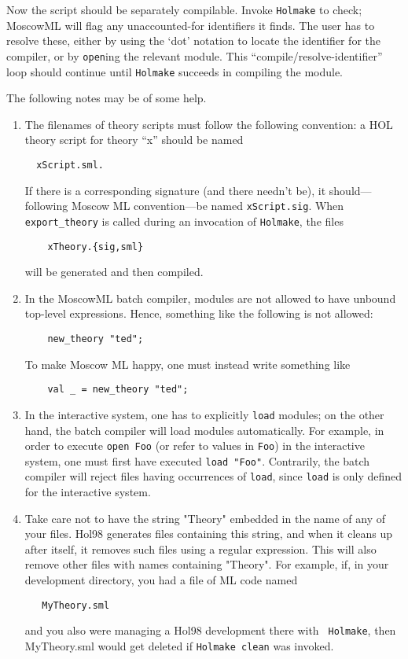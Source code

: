 \documentclass[12pt,fleqn,a4paper]{report}
\begin{document}
Now the script should be separately compilable. Invoke {\tt Holmake}
to check; MoscowML will flag any unaccounted-for identifiers it finds.
The user has to resolve these, either by using the `dot' notation to
locate the identifier for the compiler, or by \verb+open+ing the
relevant module. This ``compile/resolve-identifier'' loop should
continue until {\tt Holmake} succeeds in compiling the module.

The following notes may be of some help.

\begin{enumerate}
\item The filenames of theory scripts must follow the following
  convention: a HOL theory script for theory ``x'' should be named
\begin{verbatim}
  xScript.sml.
\end{verbatim}
  If there is a corresponding signature (and there needn't be), it
  should---following Moscow ML convention---be named
  \verb+xScript.sig+. When \verb+export_theory+ is called during an
  invocation of \verb+Holmake+, the files
\begin{verbatim}
    xTheory.{sig,sml}
\end{verbatim}
will be generated and then compiled.

\item In the MoscowML batch compiler, modules are not allowed to have
  unbound top-level expressions. Hence, something like the following
  is not allowed:
\begin{verbatim}
    new_theory "ted";
\end{verbatim}
To make Moscow ML happy, one must instead write something like
\begin{verbatim}
    val _ = new_theory "ted";
\end{verbatim}

\item In the interactive system, one has to explicitly \verb+load+
  modules; on the other hand, the batch compiler will load modules
  automatically.  For example, in order to execute \verb+open Foo+ (or
  refer to values in \verb+Foo+) in the interactive system, one must
  first have executed \verb+load "Foo"+. Contrarily, the batch
  compiler will reject files having occurrences of \verb+load+, since
  \verb+load+ is only defined for the interactive system.

\item Take care not to have the string "Theory" embedded in the name
  of any of your files. Hol98 generates files containing this string,
  and when it cleans up after itself, it removes such files using a
  regular expression. This will also remove other files with names
  containing "Theory". For example, if, in your development directory,
  you had a file of ML code named
\begin{verbatim}
   MyTheory.sml
\end{verbatim}
  and you also were managing a Hol98 development there with {\tt
    Holmake}, then MyTheory.sml would get deleted if {\tt Holmake
    clean} was invoked.


\end{enumerate}
\end{document}
